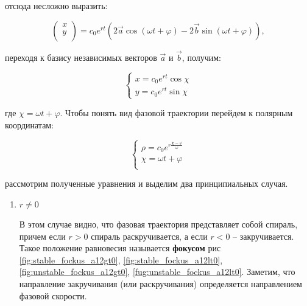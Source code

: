 \begin{enumerate}
  отсюда несложно выразить:

  \begin{equation}
    \begin{pmatrix}
      x \\ 
      y \\
    \end{pmatrix} = 
    c_0 e^{r t} (2 \vec{a} \cos (\omega t + \varphi) - 2 \vec{b} \sin (\omega t + \varphi)),
  \end{equation}

  переходя к базису независимых векторов $\vec{a}$ и $\vec{b}$, получим:

  \begin{equation}
    \begin{cases}
      x = c_0 e^{r t} \cos {\chi} \\
      y = c_0 e^{r t} \sin {\chi}
    \end{cases}
  \end{equation}
  
  где $\chi = \omega t + \varphi$. Чтобы понять вид фазовой траектории перейдем к полярным координатам:

  \begin{equation}
    \begin{cases}
      \rho = c_0 e^{r \frac{\chi - \varphi}{\omega}} \\
      \chi = \omega t + \varphi \\
    \end{cases}
  \end{equation}

  рассмотрим полученные уравнения и выделим два принципиальных случая.

  \begin{enumerate}
    \item $r \neq 0$
    
    В этом случае видно, что фазовая траектория представляет собой спираль, причем если $r > 0$ спираль раскручивается, а если $r < 0$ -- закручивается. Такое положение равновесия называется \textbf{фокусом} рис \ref{fig:stable_fockus_a12gt0}, \ref{fig:stable_fockus_a12lt0}, \ref{fig:unstable_fockus_a12gt0}, \ref{fug:unstable_fockus_a12lt0}. Заметим, что направление закручивания (или раскручивания) определяется направлением фазовой скорости.


\end{enumerate}
\end{enumerate}
